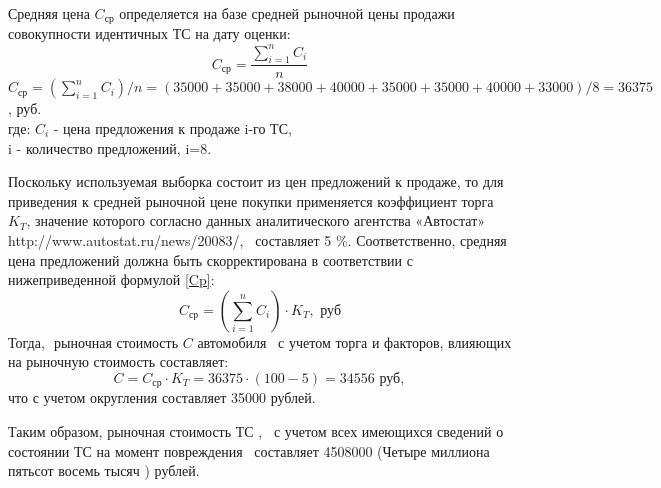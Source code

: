 Средняя цена  $C_\text{ср}$  определяется на базе  средней рыночной цены продажи совокупности идентичных ТС на дату оценки: 
\begin{equation}\label{C}
C_\text{ср} =   \frac{ \sum\limits_{i=1}^n{C_i}}{n}
\end{equation}
 $C_\text{ср} =(\sum\limits_{i=1}^n{C_i})/n= (35000+35000+38000+40000+35000+35000+40000+33000)/8 =36 375 $, руб.\\
\noindent где: $ C_i $ - цена предложения к продаже i-го ТС, \\
\indent i - количество предложений, i=8.
\par Поскольку используемая выборка состоит из цен предложений к продаже, то для приведения к средней рыночной цене покупки применяется коэффициент торга $ K_T $, значение которого согласно данных аналитического агентства «Автостат» http://www.autostat.ru/news/20083/, %
\, составляет 5 \%. Соответственно, средняя цена предложений должна быть скорректирована в соответствии с нижеприведенной формулой \ref{Cp}:
\begin{equation}\label{Cp}
C_\text{ср} =  \left( \sum\limits_{i=1}^n{C_i}\right)  \cdot K_T , \,\, \text{руб}
\end{equation}
Тогда,\,\, рыночная стоимость $ C $ автомобиля  \, с учетом торга и факторов, влияющих на рыночную стоимость составляет: 
\begin{equation}\label{cp}
C = C_\text{ср} \cdot  K_T 
= 36375 \cdot(100-5)
=  34556 \, \, \text{руб},
\end{equation} 
\noindent что с учетом округления составляет 35000  рублей.

\par Таким образом, рыночная стоимость ТС , \, с учетом всех имеющихся сведений о состоянии ТС на момент повреждения \,  составляет  4508000 (Четыре миллиона пятьсот восемь тысяч )  рублей.





